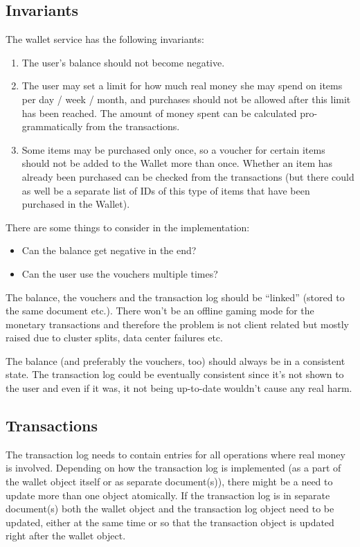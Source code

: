 \documentclass[11pt,a4paper]{report}
\begin{document}
\subsection{Invariants}
The wallet  service has the following invariants:
\begin{enumerate}
\item The user's balance should not become negative.
\item The user may set a limit for how much real money she may spend on items per day / week / month, and purchases should not be allowed after this limit has been reached. The amount of money spent can be calculated pro-grammatically from the transactions.
\item Some items may be purchased only once, so a voucher for certain items should not be added to the Wallet more than once. Whether an item has already been purchased can be checked from the transactions (but there could as well be a separate list of IDs of this type of items that have been purchased in the Wallet).
\end{enumerate}
There are some things to consider in the implementation:

\begin{itemize}
\item Can the balance get negative in the end?
\item Can the user use the vouchers multiple times?
\end{itemize}

The balance, the vouchers and the transaction log should be ``linked'' (stored to the same document etc.). There won't be an offline gaming mode for the monetary transactions and therefore the problem is not client related but mostly raised due to cluster splits, data center failures etc.

The balance (and preferably the vouchers, too) should always be in a consistent state. 
The transaction log could be eventually consistent since it's not shown to the user and even if it was, it not being up­-to-­date wouldn't cause any real harm.

\subsection{Transactions}
The transaction log needs to contain entries for all operations where real money is involved. Depending on how the transaction log is implemented (as a part of the wallet object itself or as separate document(s)), there might be a need to update more than one object atomically. If the transaction log is in separate document(s) both the wallet object and the transaction log object need to be updated, either at the same time or so that the transaction object is updated right after the wallet object.
\end{document}
